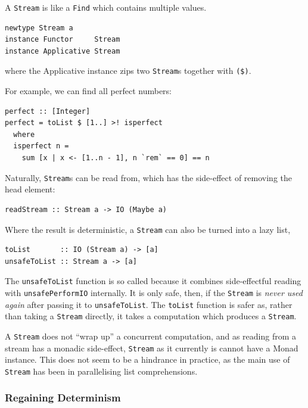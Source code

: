 A \verb|Stream| is like a \verb|Find| which contains multiple
values.

\begin{verbatim}
newtype Stream a
instance Functor     Stream
instance Applicative Stream
\end{verbatim}

\noindent where the Applicative instance zips two \verb|Stream|s
together with \verb|($)|.

For example, we can find all perfect numbers:

\begin{verbatim}
perfect :: [Integer]
perfect = toList $ [1..] >! isperfect
  where
  isperfect n =
    sum [x | x <- [1..n - 1], n `rem` == 0] == n
\end{verbatim}

Naturally, \verb|Stream|s can be read from, which has the side-effect
of removing the head element:

\begin{verbatim}
readStream :: Stream a -> IO (Maybe a)
\end{verbatim}

Where the result is deterministic, a \verb|Stream| can also be turned
into a lazy list,

\begin{verbatim}
toList       :: IO (Stream a) -> [a]
unsafeToList :: Stream a -> [a]
\end{verbatim}

The \verb|unsafeToList| function is so called because it combines
side-effectful reading with \verb|unsafePerformIO| internally. It is
only safe, then, if the \verb|Stream| is \textit{never used again}
after passing it to \verb|unsafeToList|. The \verb|toList| function is
safer as, rather than taking a \verb|Stream| directly, it takes a
computation which produces a \verb|Stream|.

A \verb|Stream| does not ``wrap up'' a concurrent computation, and as
reading from a stream has a monadic side-effect, \verb|Stream| as it
currently is cannot have a Monad instance. This does not seem to be a
hindrance in practice, as the main use of \verb|Stream| has been in
parallelising list comprehensions.

\subsubsection{Regaining Determinism}
\label{sec:prelims-searchparty-api-det}

